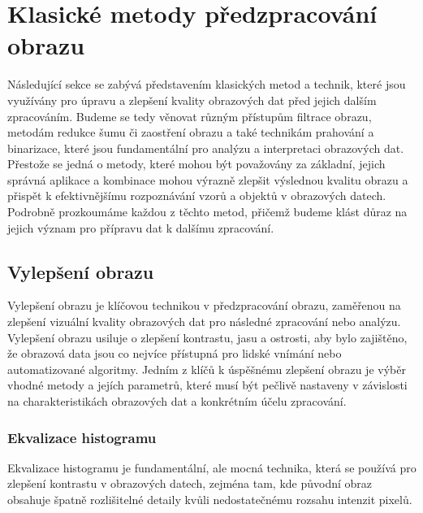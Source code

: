 \documentclass[male,czech,api_ing]{thesis}
\begin{document}
\section{Klasické metody předzpracování obrazu}
Následující sekce se zabývá představením klasických metod a technik, které jsou využívány pro úpravu a zlepšení kvality obrazových dat před jejich dalším zpracováním. Budeme se tedy věnovat různým přístupům filtrace obrazu, metodám redukce šumu či zaostření obrazu a také technikám prahování a binarizace, které jsou fundamentální pro analýzu a interpretaci obrazových dat. Přestože se jedná o metody, které mohou být považovány za základní, jejich správná aplikace a kombinace mohou výrazně zlepšit výslednou kvalitu obrazu a přispět k efektivnějšímu rozpoznávání vzorů a objektů v obrazových datech. Podrobně prozkoumáme každou z těchto metod, přičemž budeme klást důraz na jejich význam pro přípravu dat k dalšímu zpracování.

\subsection{Vylepšení obrazu}
Vylepšení obrazu je klíčovou technikou v předzpracování obrazu, zaměřenou na zlepšení vizuální kvality obrazových dat pro následné zpracování nebo analýzu. Vylepšení obrazu usiluje o zlepšení kontrastu, jasu a ostrosti, aby bylo zajištěno, že obrazová data jsou co nejvíce přístupná pro lidské vnímání nebo automatizované algoritmy. 
Jedním z klíčů k úspěšnému zlepšení obrazu je výběr vhodné metody a jejích parametrů, které musí být pečlivě nastaveny v závislosti na charakteristikách obrazových dat a konkrétním účelu zpracování. 

\subsubsection{Ekvalizace histogramu}
Ekvalizace histogramu je fundamentální, ale mocná technika, která se používá pro zlepšení kontrastu v obrazových datech, zejména tam, kde původní obraz obsahuje špatně rozlišitelné detaily kvůli nedostatečnému rozsahu intenzit pixelů.
\end{document}
